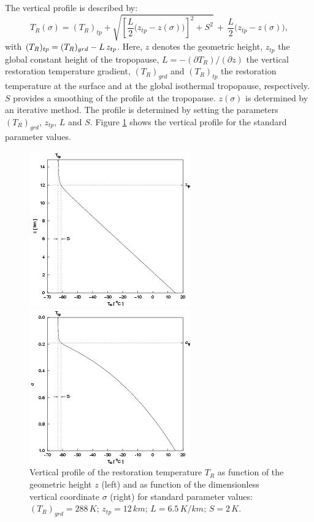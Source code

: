 The vertical profile is described by:
\begin{equation}
T_R(\sigma) = (T_R)_{tp}+\sqrt{\left[\frac{L}{2}\Big(z_{tp}-z(\sigma)\Big)\right]^2+S^2}\,+\,\frac{L}{2}\Big(z_{tp}-z(\sigma)\Big),
\end{equation}
with $\displaystyle (T_R)_{tp}=(T_R)_{grd}-L\,z_{tp}$. Here, $z$ denotes the geometric 
height, $z_{tp}$ the global constant height of the tropopause, 
$L=-(\partial T_R)/(\partial z)$ the vertical restoration temperature gradient, 
$(T_R)_{grd}$ and $(T_R)_{tp}$ the restoration temperature at the surface and at 
the global isothermal tropopause, respectively. $S$ provides a smoothing of the 
profile at the tropopause. $z(\sigma)$ is determined by an iterative method. 
The profile is determined by setting the parameters $(T_R)_{grd}$, $z_{tp}$, 
$L$ and $S$.  Figure \ref{Tr_z} shows the vertical profile for the standard 
parameter values.

\begin{figure}[h]
\begin{minipage}{.5\linewidth}
\includegraphics{Pics/Tr_z_Eng}
\end{minipage}
\begin{minipage}{.5\linewidth}
\includegraphics{Pics/Tr_sigma_Eng}
\end{minipage}
\caption{\footnotesize{Vertical profile of the restoration temperature $T_R$ as 
function of the geometric height $z$ (left) and as function of the dimensionless 
vertical coordinate $\sigma$ (right) for standard parameter values: 
$(T_R)_{grd}=288\,K$; $z_{tp}=12\,km$; $L=6.5\,K/km$; $S=2\,K$.}} \label{Tr_z}
\end{figure}

